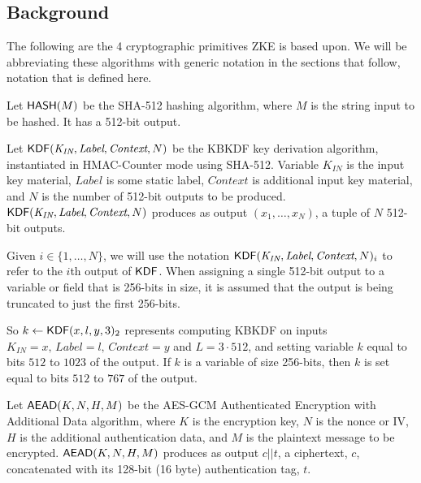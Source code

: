 \documentclass{article}
\begin{document}
\subsection{Background}

The following are the 4 cryptographic primitives ZKE is based upon. We will be abbreviating these algorithms with generic notation in the sections that follow, notation that is defined here.

\newcommand{\HASH}{\algn{HASH}}
\newcommand{\KDF}{\algn{KDF}}
\newcommand{\AEAD}{\algn{AEAD}}
\newcommand{\DHGEN}{\algn{DH-Gen}}
\newcommand{\KEMGEN}{\algn{KEM-Gen}}
\newcommand{\KEMENC}{\algn{KEM-Enc}}
\newcommand{\KEMDEC}{\algn{KEM-Dec}}
\newcommand{\COUNTER}{\algn{Count}}
\newcommand{\KID}{\algn{KID-Gen}}

\begin{definition}
	Let $\HASH(M)$ be the SHA-512 hashing algorithm, where $M$ is the string input to be hashed. It has a 512-bit output.
\end{definition}

\begin{definition}
	Let $\KDF(\textit{K}_{\textit{IN}}, \textit{Label}, \textit{Context}, N)$ be the KBKDF key derivation algorithm, instantiated in HMAC-Counter mode using SHA-512. Variable $\textit{K}_{\textit{IN}}$ is the input key material, $\textit{Label}$ is some static label, $\textit{Context}$ is additional input key material, and $N$ is the number of 512-bit outputs to be produced. $\KDF(\textit{K}_{\textit{IN}}, \textit{Label}, \textit{Context}, N)$ produces as output $(x_1,\ldots,x_N)$, a tuple of $N$ 512-bit outputs.

	Given $i\in \{1,\ldots,N\}$, we will use the notation $\KDF(\textit{K}_{\textit{IN}}, \textit{Label}, \textit{Context}, N)_i$ to refer to the $i$th output of $\KDF$. When assigning a single 512-bit output to a variable or field that is 256-bits in size, it is assumed that the output is being truncated to just the first 256-bits.

	So $k\gets \KDF(x, l, y, 3)_2$ represents computing KBKDF on inputs $\textit{K}_{\textit{IN}}= x,\, \textit{Label}=l,\, \textit{Context}=y$ and $L=3\cdot 512$, and setting variable $k$ equal to bits $512$ to $1023$ of the output. If $k$ is a variable of size 256-bits, then $k$ is set equal to bits $512$ to $767$ of the output.
\end{definition}

\begin{definition}
	Let $\AEAD(K, N, H, M)$ be the AES-GCM Authenticated Encryption with Additional Data algorithm, where $K$ is the encryption key, $N$ is the nonce or IV, $H$ is the additional authentication data, and $M$ is the plaintext message to be encrypted. $\AEAD(K, N, H, M)$ produces as output $c||t$, a ciphertext, $c$, concatenated with its 128-bit (16 byte) authentication tag, $t$.
\end{definition}
\end{document}
